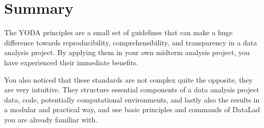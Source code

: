 \sphinxstepscope


\section{Summary}
\label{\detokenize{basics/101-128-summary_yoda:summary}}\label{\detokenize{basics/101-128-summary_yoda:summary-yoda}}\label{\detokenize{basics/101-128-summary_yoda::doc}}
\sphinxAtStartPar
The YODA principles are a small set of guidelines that can make a huge
difference towards reproducibility, comprehensibility, and transparency
in a data analysis project. By applying them in your own midterm analysis
project, you have experienced their immediate benefits.

\sphinxAtStartPar
You also noticed that these standards are not complex \textendash{} quite the opposite,
they are very intuitive.
They structure essential components of a data analysis project \textendash{}
data, code, potentially computational environments, and lastly also the results \textendash{}
in a modular and practical way, and use basic principles and commands
of DataLad you are already familiar with.


